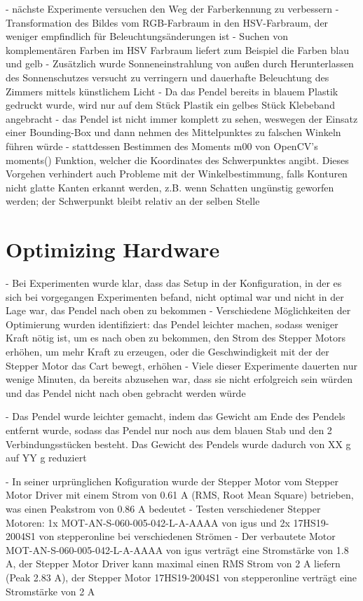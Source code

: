 - nächste Experimente versuchen den Weg der Farberkennung zu verbessern
- Transformation des Bildes vom RGB-Farbraum in den HSV-Farbraum, der weniger empfindlich für Beleuchtungsänderungen ist
- Suchen von komplementären Farben im HSV Farbraum liefert zum Beispiel die Farben blau und gelb
- Zusätzlich wurde Sonneneinstrahlung von außen durch Herunterlassen des Sonnenschutzes versucht zu verringern und dauerhafte Beleuchtung des Zimmers mittels künstlichem Licht 
- Da das Pendel bereits in blauem Plastik gedruckt wurde, wird nur auf dem Stück Plastik ein gelbes Stück Klebeband angebracht
- das Pendel ist nicht immer komplett zu sehen, weswegen der Einsatz einer Bounding-Box und dann nehmen des Mittelpunktes zu falschen Winkeln führen würde
- stattdessen Bestimmen des Moments m00 von OpenCV's moments() Funktion, welcher die Koordinates des Schwerpunktes angibt. Dieses Vorgehen verhindert auch Probleme mit der Winkelbestimmung, falls Konturen nicht glatte Kanten erkannt werden, z.B. wenn Schatten ungünstig geworfen werden; der Schwerpunkt bleibt relativ an der selben Stelle

\section{Optimizing Hardware}
- Bei Experimenten wurde klar, dass das Setup in der Konfiguration, in der es sich bei vorgegangen Experimenten befand, nicht optimal war und nicht in der Lage war, das Pendel nach oben zu bekommen
- Verschiedene Möglichkeiten der Optimierung wurden identifiziert: das Pendel leichter machen, sodass weniger Kraft nötig ist, um es nach oben zu bekommen, den Strom des Stepper Motors erhöhen, um mehr Kraft zu erzeugen, oder die Geschwindigkeit mit der der Stepper Motor das Cart bewegt, erhöhen
- Viele dieser Experimente dauerten nur wenige Minuten, da bereits abzusehen war, dass sie nicht erfolgreich sein würden und das Pendel nicht nach oben gebracht werden würde

- Das Pendel wurde leichter gemacht, indem das Gewicht am Ende des Pendels entfernt wurde, sodass das Pendel nur noch aus dem blauen Stab und den 2 Verbindungsstücken besteht. Das Gewicht des Pendels wurde dadurch von XX g auf YY g reduziert %

- In seiner urprünglichen Kofiguration wurde der Stepper Motor vom Stepper Motor Driver mit einem Strom von 0.61 A (RMS, Root Mean Square) betrieben, was einen Peakstrom von 0.86 A bedeutet
- Testen verschiedener Stepper Motoren: 1x MOT-AN-S-060-005-042-L-A-AAAA von igus und 2x 17HS19-2004S1 von stepperonline bei verschiedenen Strömen
- Der verbautete Motor MOT-AN-S-060-005-042-L-A-AAAA von igus verträgt eine Stromstärke von 1.8 A, der Stepper Motor Driver kann maximal einen RMS Strom von 2 A liefern (Peak 2.83 A), der Stepper Motor 17HS19-2004S1 von stepperonline verträgt eine Stromstärke von 2 A 

